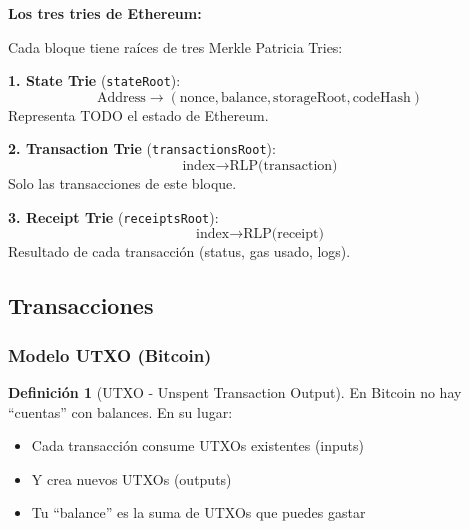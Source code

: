\documentclass[11pt,a4paper,twoside,openright]{book}
\theoremstyle{definition}
\newtheorem{definition}{Definición}[chapter]
\theoremstyle{plain}
\theoremstyle{remark}
\begin{document}
\begin{mathnote}
\textbf{Los tres tries de Ethereum:}

Cada bloque tiene raíces de tres Merkle Patricia Tries:

\textbf{1. State Trie} (\texttt{stateRoot}):
\[ \text{Address} \to (\text{nonce}, \text{balance}, \text{storageRoot}, \text{codeHash}) \]
Representa TODO el estado de Ethereum.

\textbf{2. Transaction Trie} (\texttt{transactionsRoot}):
\[ \text{index} \to \text{RLP(transaction)} \]
Solo las transacciones de este bloque.

\textbf{3. Receipt Trie} (\texttt{receiptsRoot}):
\[ \text{index} \to \text{RLP(receipt)} \]
Resultado de cada transacción (status, gas usado, logs).
\end{mathnote}

\subsection{Transacciones}

\subsubsection{Modelo UTXO (Bitcoin)}

\begin{definition}[UTXO - Unspent Transaction Output]
En Bitcoin no hay ``cuentas'' con balances. En su lugar:
\begin{itemize}
    \item Cada transacción consume UTXOs existentes (inputs)
    \item Y crea nuevos UTXOs (outputs)
    \item Tu ``balance'' es la suma de UTXOs que puedes gastar
\end{itemize}
\end{definition}
\end{document}
